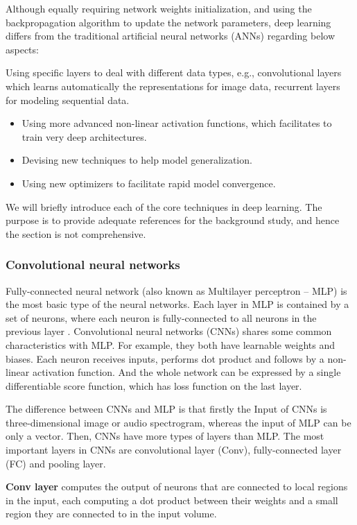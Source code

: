 Although equally requiring network weights initialization, and using the backpropagation algorithm to update the network parameters, deep learning differs from the traditional artificial neural networks (ANNs) regarding below aspects:

Using specific layers to deal with different data types, e.g., convolutional layers which learns automatically the representations for image data, recurrent layers for modeling sequential data.

\begin{itemize}[noitemsep]
\item Using more advanced non-linear activation functions, which facilitates to train very deep architectures.
\item Devising new techniques to help model generalization.
\item Using new optimizers to facilitate rapid model convergence.
\end{itemize} 

We will briefly introduce each of the core techniques in deep learning. The purpose is to provide adequate references for the background study, and hence the section is not comprehensive.

\subsubsection{Convolutional neural networks}

Fully-connected neural network (also known as Multilayer perceptron -- MLP) is the most basic type of the neural networks. Each layer in MLP is contained by a set of neurons, where each neuron is fully-connected to all neurons in the previous layer \cite{Stanforduniversity}. Convolutional neural networks (CNNs) shares some common characteristics with MLP. For example, they both have learnable weights and biases. Each neuron receives inputs, performs dot product and follows by a non-linear activation function. And the whole network can be expressed by a single differentiable score function, which has loss function on the last layer.

The difference between CNNs and MLP is that firstly the Input of CNNs is three-dimensional image or audio spectrogram, whereas the input of MLP can be only a vector. Then, CNNs have more types of layers than MLP. The most important layers in CNNs are convolutional layer (Conv), fully-connected layer (FC) and pooling layer.

\noindent\textbf{Conv layer} computes the output of neurons that are connected to local regions in the input, each computing a dot product between their weights and a small region they are connected to in the input volume. 

